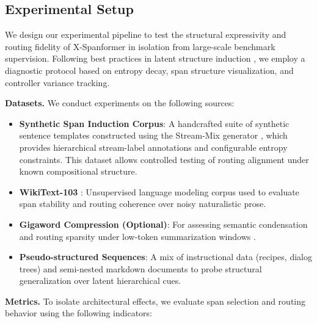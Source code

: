\subsection{Experimental Setup}
\label{sec:experimental-setup}

We design our experimental pipeline to test the structural expressivity and routing fidelity of X-Spanformer in isolation from large-scale benchmark supervision. Following best practices in latent structure induction \cite{kim2019unsupervised, naradowsky2021structured, liu2019hierarchical}, we employ a diagnostic protocol based on entropy decay, span structure visualization, and controller variance tracking.

\vspace{0.5em}
\noindent\textbf{Datasets.} We conduct experiments on the following sources:

\begin{itemize}[leftmargin=1.5em]
  \item \textbf{Synthetic Span Induction Corpus}: A handcrafted suite of synthetic sentence templates constructed using the Stream-Mix generator \cite{rawson2025streammix}, which provides hierarchical stream-label annotations and configurable entropy constraints. This dataset allows controlled testing of routing alignment under known compositional structure.
  
  \item \textbf{WikiText-103} \cite{merity2016pointer}: Unsupervised language modeling corpus used to evaluate span stability and routing coherence over noisy naturalistic prose.

  \item \textbf{Gigaword Compression (Optional)}: For assessing semantic condensation and routing sparsity under low-token summarization windows \cite{rush2015neural}.

  \item \textbf{Pseudo-structured Sequences}: A mix of instructional data (recipes, dialog trees) and semi-nested markdown documents to probe structural generalization over latent hierarchical cues.
\end{itemize}

\vspace{0.5em}
\noindent\textbf{Metrics.} To isolate architectural effects, we evaluate span selection and routing behavior using the following indicators:

